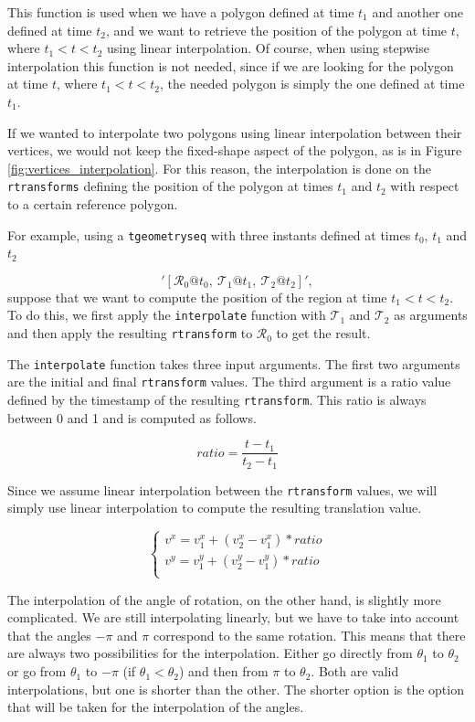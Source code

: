 This function is used when we have a polygon defined at time $t_1$ and another one defined at time $t_2$, and we want to retrieve the position of the polygon at time $t$, where $t_1 < t < t_2$ using linear interpolation. Of course, when using stepwise interpolation this function is not needed, since if we are looking for the polygon at time $t$, where $t_1 < t < t_2$, the needed polygon is simply the one defined at time $t_1$.

If we wanted to interpolate two polygons using linear interpolation between their vertices, we would not keep the fixed-shape aspect of the polygon, as is in Figure \ref{fig:vertices_interpolation}. For this reason, the interpolation is done on the \lstinline{rtransforms} defining the position of the polygon at times $t_1$ and $t_2$ with respect to a certain reference polygon.

For example, using a \lstinline{tgeometryseq} with three instants defined at times $t_0$, $t_1$ and $t_2$

\[
    '[\mathcal{R}_0@t_0,\ \mathcal{T}_1@t_1,\ \mathcal{T}_2@t_2]', 
\]
suppose that we want to compute the position of the region at time $t_1 < t < t_2$. To do this, we first apply the \lstinline{interpolate} function with $\mathcal{T}_1$ and $\mathcal{T}_2$ as arguments and then apply the resulting \lstinline{rtransform} to $\mathcal{R}_0$ to get the result.

The \lstinline{interpolate} function takes three input arguments. The first two arguments are the initial and final \lstinline{rtransform} values. The third argument is a ratio value defined by the timestamp of the resulting \lstinline+rtransform+. This ratio is always between 0 and 1 and is computed as follows.

\[
    ratio = \frac{t - t_1}{t_2 - t_1}
\]

Since we assume linear interpolation between the \lstinline{rtransform} values, we will simply use linear interpolation to compute the resulting translation value.

\[
    \begin{cases}
        v^x = v_1^x + (v_2^x - v_1^x) * ratio \\
        v^y = v_1^y + (v_2^y - v_1^y) * ratio \\
    \end{cases}
\]

The interpolation of the angle of rotation, on the other hand, is slightly more complicated. We are still interpolating linearly, but we have to take into account that the angles $-\pi$ and $\pi$ correspond to the same rotation. This means that there are always two possibilities for the interpolation. Either go directly from $\theta_1$ to $\theta_2$ or go from $\theta_1$ to $-\pi$ (if $\theta_1 < \theta_2$) and then from $\pi$ to $\theta_2$. Both are valid interpolations, but one is shorter than the other. The shorter option is the option that will be taken for the interpolation of the angles.

